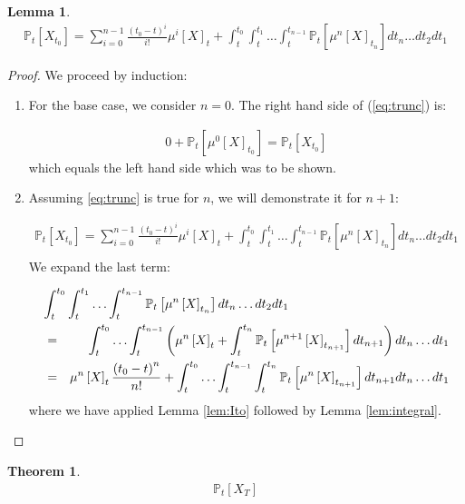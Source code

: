 \documentclass{article}
\newtheorem{thm}{Theorem}
\newtheorem{lem}{Lemma}
\newcommand{\bra}[1]{\left[#1\right]}
\renewcommand{\P}[1]{\mathbb{P}_t\bra{#1}}
\newcommand{\mun}[2]{\mu^{#1}\bra{#2}}
\begin{document}
\begin{lem}
  \begin{eqnarray}
    \P{X_{t_0}} = \sum_{i=0}^{n-1} \frac{\left(t_0 - t\right)^i}{i!} \mun{i}{X}_t + \int_t^{t_0} \int_t^{t_1} \ldots \int_t^{t_{n-1}} \P{\mun{n}{X}_{t_n}} dt_n \ldots dt_2 dt_1\label{eq:trunc}
  \end{eqnarray}
\end{lem}
\begin{proof}
  We proceed by induction:

  \begin{enumerate}
  \item
    For the base case, we consider $n=0$.
    The right hand side of (\ref{eq:trunc}) is:

    \begin{eqnarray*}
      0 + \P{\mun{0}{X}_{t_0}} = \P{X_{t_0}}
    \end{eqnarray*}
    which equals the left hand side which was to be shown.

  \item
    Assuming \ref{eq:trunc} is true for $n$, we will demonstrate it for $n+1$:
    
    \begin{eqnarray*}
\P{X_{t_0}} = \sum_{i=0}^{n-1} \frac{\left(t_0 - t\right)^i}{i!} \mun{i}{X}_t + \int_t^{t_0} \int_t^{t_1} \ldots \int_t^{t_{n-1}} \P{\mun{n}{X}_{t_n}} dt_n \ldots dt_2 dt_1\\
    \end{eqnarray*}
    We expand the last term:

    \begin{eqnarray*}
      \lefteqn{\int_t^{t_0} \int_t^{t_1} \ldots \int_t^{t_{n-1}} \P{\mun{n}{X}_{t_n}} dt_n \ldots dt_2 dt_1}\\
      & = & \int_t^{t_0} \ldots \int_t^{t_{n-1}} \left(\mun{n}{X}_t + \int_t^{t_n}\P{\mun{n+1}{X}_{t_{n+1}}}dt_{n+1}\right)dt_n \ldots dt_1\\
      & = & \mun{n}{X}_t \frac{\left(t_0 - t\right)^n}{n!} + \int_t^{t_0} \ldots \int_t^{t_{n-1}} \int_t^{t_n}\P{\mun{n}{X}_{t_{n+1}}}dt_{n+1}dt_n \ldots dt_1\\
    \end{eqnarray*}
    where we have applied Lemma \ref{lem:Ito} followed by Lemma \ref{lem:integral}.
    
  \end{enumerate}
\end{proof}

\begin{thm}
  \begin{eqnarray*}
    \P{X_T}
  \end{eqnarray*}
\end{thm}
\end{document}
